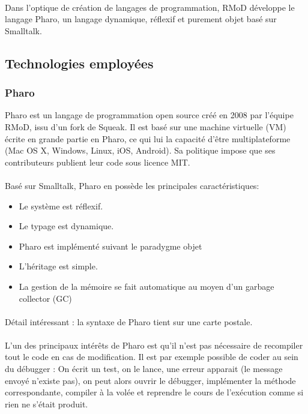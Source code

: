	\paragraph{}
	Dans l'optique de création de langages de programmation, RMoD développe le langage Pharo, un langage dynamique, réflexif et purement objet basé sur Smalltalk.

	\subsection{Technologies employées}
	\subsubsection{Pharo}
	Pharo est un langage de programmation open source créé en 2008 par l'équipe RMoD, issu d'un fork de Squeak. Il est basé sur une machine virtuelle (VM) écrite en grande partie en Pharo, ce qui lui la capacité d'être multiplateforme (Mac OS X, Windows, Linux, iOS, Android). Sa politique impose que ses contributeurs publient leur code sous licence MIT.

	\paragraph{}
	Basé sur Smalltalk, Pharo en possède les principales caractéristiques:
	\begin{itemize}
		\item Le système est réflexif.
		\item Le typage est dynamique.
		\item Pharo est implémenté suivant le paradygme objet
		\item L'héritage est simple.
		\item La gestion de la mémoire se fait automatique au moyen d'un garbage collector (GC)
	\end{itemize}

	\paragraph{}
	Détail intéressant : la syntaxe de Pharo tient sur une carte postale.

	\paragraph{}
	L'un des principaux intérêts de Pharo est qu'il n'est pas nécessaire de recompiler tout le code en cas de modification. Il est par exemple possible de coder au sein du débugger : On écrit un test, on le lance, une erreur apparait (le message envoyé n'existe pas), on peut alors ouvrir le débugger, implémenter la méthode correspondante, compiler à la volée et reprendre le cours de l'exécution comme si rien ne s'était produit.


